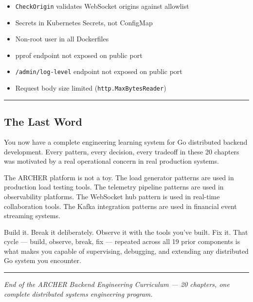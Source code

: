 \documentclass[
]{article}
\providecommand{\tightlist}{%
  \setlength{\itemsep}{0pt}\setlength{\parskip}{0pt}}
\begin{document}
\begin{itemize}
\tightlist
\item[$\square$]
  \texttt{CheckOrigin} validates WebSocket origins against allowlist
\item[$\square$]
  Secrets in Kubernetes Secrets, not ConfigMap
\item[$\square$]
  Non-root user in all Dockerfiles
\item[$\square$]
  pprof endpoint not exposed on public port
\item[$\square$]
  \texttt{/admin/log-level} endpoint not exposed on public port
\item[$\square$]
  Request body size limited (\texttt{http.MaxBytesReader})
\end{itemize}

\begin{center}\rule{0.5\linewidth}{0.5pt}\end{center}

\hypertarget{the-last-word}{%
\subsection{The Last Word}\label{the-last-word}}

You now have a complete engineering learning system for Go distributed
backend development. Every pattern, every decision, every tradeoff in
these 20 chapters was motivated by a real operational concern in real
production systems.

The ARCHER platform is not a toy. The load generator patterns are used
in production load testing tools. The telemetry pipeline patterns are
used in observability platforms. The WebSocket hub pattern is used in
real-time collaboration tools. The Kafka integration patterns are used
in financial event streaming systems.

Build it. Break it deliberately. Observe it with the tools you've built.
Fix it. That cycle --- build, observe, break, fix --- repeated across
all 19 prior components is what makes you capable of supervising,
debugging, and extending any distributed Go system you encounter.

\begin{center}\rule{0.5\linewidth}{0.5pt}\end{center}

\emph{End of the ARCHER Backend Engineering Curriculum --- 20 chapters,
one complete distributed systems engineering program.}
\end{document}
